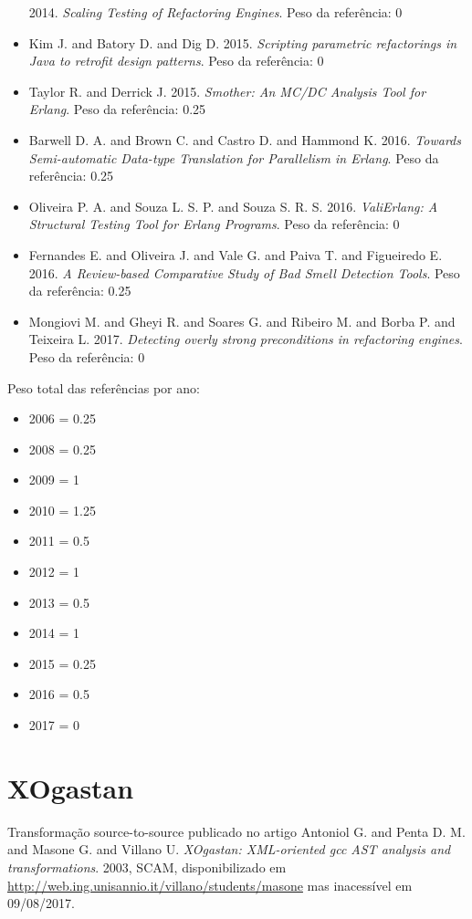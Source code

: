 \begin{itemize}
      2014.
      {\it Scaling Testing of Refactoring Engines}.
      Peso da referência: 0
\item Kim J. and Batory D. and Dig D.
      2015.
      {\it Scripting parametric refactorings in Java to retrofit design patterns}.
      Peso da referência: 0
\item Taylor R. and Derrick J.
      2015.
      {\it Smother: An MC/DC Analysis Tool for Erlang}.
      Peso da referência: 0.25
\item Barwell D. A. and Brown C. and Castro D. and Hammond K.
      2016.
      {\it Towards Semi-automatic Data-type Translation for Parallelism in Erlang}.
      Peso da referência: 0.25
\item Oliveira P. A. and Souza L. S. P. and Souza S. R. S.
      2016.
      {\it ValiErlang: A Structural Testing Tool for Erlang Programs}.
      Peso da referência: 0
\item Fernandes E. and Oliveira J. and Vale G. and Paiva T. and Figueiredo E.
      2016.
      {\it A Review-based Comparative Study of Bad Smell Detection Tools}.
      Peso da referência: 0.25
\item Mongiovi M. and Gheyi R. and Soares G. and Ribeiro M. and Borba P. and Teixeira L.
      2017.
      {\it Detecting overly strong preconditions in refactoring engines}.
      Peso da referência: 0
\end{itemize}

Peso total das referências por ano:

\begin{itemize}
\item 2006 = 0.25
\item 2008 = 0.25
\item 2009 = 1
\item 2010 = 1.25
\item 2011 = 0.5
\item 2012 = 1
\item 2013 = 0.5
\item 2014 = 1
\item 2015 = 0.25
\item 2016 = 0.5
\item 2017 = 0
\end{itemize}


\section{XOgastan}

Transformação source-to-source
publicado no artigo
Antoniol G. and Penta D. M. and Masone G. and Villano U.
{\it XOgastan: XML-oriented gcc AST analysis and transformations}.
2003,
SCAM,
disponibilizado em \url{http://web.ing.unisannio.it/villano/students/masone}
mas inacessível em 09/08/2017.

